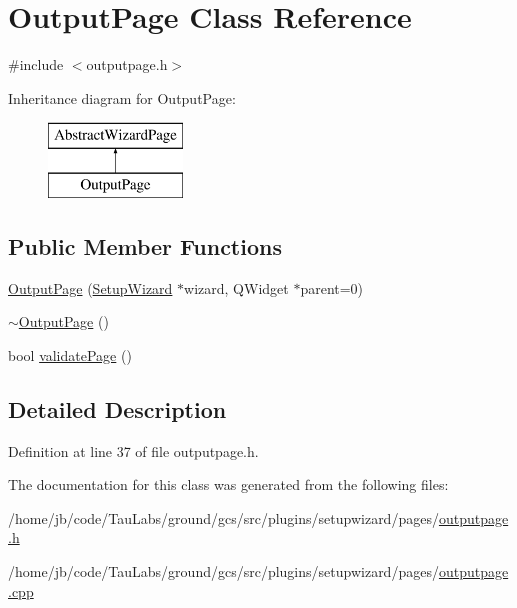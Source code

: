 \hypertarget{class_output_page}{\section{\-Output\-Page \-Class \-Reference}
\label{class_output_page}
}


{\ttfamily \#include $<$outputpage.\-h$>$}

\-Inheritance diagram for \-Output\-Page\-:\begin{figure}[H]
\begin{center}
\leavevmode
\includegraphics[height=2.000000cm]{class_output_page}
\end{center}
\end{figure}
\subsection*{\-Public \-Member \-Functions}
\begin{DoxyCompactItemize}
\item 
\hyperlink{group___output_page_ga49bfd1f39b52816cb9ea7f7befb32af1}{\-Output\-Page} (\hyperlink{class_setup_wizard}{\-Setup\-Wizard} $\ast$wizard, \-Q\-Widget $\ast$parent=0)
\item 
\hyperlink{group___output_page_ga475a6fbc3d6362b5b0030dd16b312855}{$\sim$\-Output\-Page} ()
\item 
bool \hyperlink{group___output_page_ga69997333a8bb3353d0c3f9394cc493b9}{validate\-Page} ()
\end{DoxyCompactItemize}


\subsection{\-Detailed \-Description}


\-Definition at line 37 of file outputpage.\-h.



\-The documentation for this class was generated from the following files\-:\begin{DoxyCompactItemize}
\item 
/home/jb/code/\-Tau\-Labs/ground/gcs/src/plugins/setupwizard/pages/\hyperlink{outputpage_8h}{outputpage.\-h}\item 
/home/jb/code/\-Tau\-Labs/ground/gcs/src/plugins/setupwizard/pages/\hyperlink{outputpage_8cpp}{outputpage.\-cpp}\end{DoxyCompactItemize}
